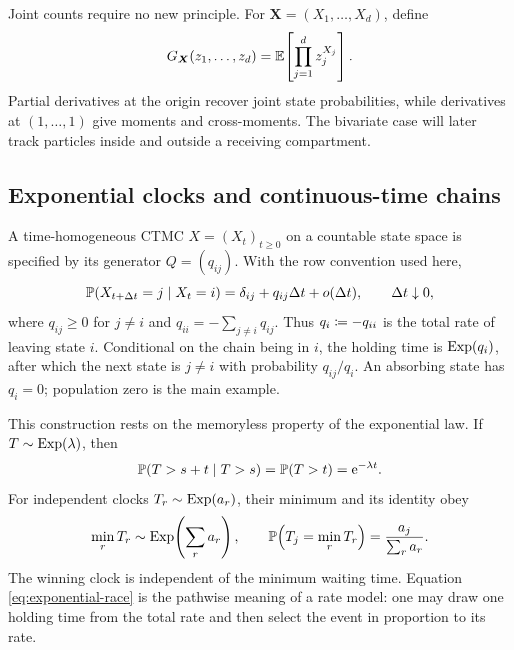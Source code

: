 Joint counts require no new principle.  For
\(\boldsymbol X=(X_1,\ldots,X_d)\), define
\begin{equation}
  G_{\boldsymbol X}(z_1,\ldots,z_d)
  =\mathbb{E}\!\left[\prod_{j=1}^{d}z_j^{X_j}\right].
  \label{eq:multivariate-pgf}
\end{equation}
Partial derivatives at the origin recover joint state probabilities, while
derivatives at \((1,\ldots,1)\) give moments and cross-moments.  The bivariate
case will later track particles inside and outside a receiving compartment.

\subsection{Exponential clocks and continuous-time chains}

A time-homogeneous CTMC \(X=(X_t)_{t\geq0}\) on a countable state space is
specified by its generator \(Q=(q_{ij})\).  With the row convention used here,
\begin{equation}
  \mathbb{P}(X_{t+\Delta t}=j\mid X_t=i)
  =\delta_{ij}+q_{ij}\Delta t+o(\Delta t),
  \qquad \Delta t\downarrow0,
  \label{eq:generator-short-time}
\end{equation}
where \(q_{ij}\geq0\) for \(j\neq i\) and
\(q_{ii}=-\sum_{j\neq i}q_{ij}\).  Thus
\(q_i\coloneqq-q_{ii}\) is the total rate of leaving state \(i\).  Conditional on
the chain being in \(i\), the holding time is \(\operatorname{Exp}(q_i)\), after which the
next state is \(j\neq i\) with probability \(q_{ij}/q_i\).  An absorbing state
has \(q_i=0\); population zero is the main example.

This construction rests on the memoryless property of the exponential law.  If
\(T\sim\operatorname{Exp}(\lambda)\), then
\[
  \mathbb{P}(T>s+t\mid T>s)=\mathbb{P}(T>t)=\mathrm{e}^{-\lambda t}.
\]
For independent clocks \(T_r\sim\operatorname{Exp}(a_r)\), their minimum and its identity obey
\begin{equation}
  \min_r T_r\sim\operatorname{Exp}\!\left(\sum_r a_r\right),
  \qquad
  \mathbb{P}\!\left(T_j=\min_rT_r\right)=\frac{a_j}{\sum_r a_r}.
  \label{eq:exponential-race}
\end{equation}
The winning clock is independent of the minimum waiting time.  Equation
\eqref{eq:exponential-race} is the pathwise meaning of a rate model: one may draw
one holding time from the total rate and then select the event in proportion to
its rate.

